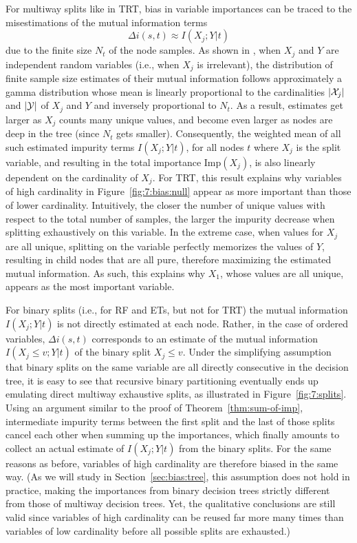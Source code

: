 For multiway splits like in TRT, bias in variable importances can be traced to the
misestimations of the mutual information terms
\begin{equation}
\Delta i(s, t) \approx I(X_j;Y|t)
\end{equation}
due to the finite size $N_t$ of the node samples. As shown in
\citep{goebel:2005}, when $X_j$ and $Y$ are independent random variables (i.e.,
when $X_j$ is irrelevant), the distribution of finite sample size estimates of
their mutual information  follows approximately a gamma distribution whose mean
is linearly proportional to the cardinalities $|{\cal X}_j|$ and $|{\cal Y}|$
of $X_j$ and $Y$ and inversely proportional to $N_t$.
As a result, estimates get larger as $X_j$ counts many unique values, and
become even larger as nodes are deep in the tree (since $N_t$ gets smaller).
Consequently, the weighted mean of all such estimated impurity terms
$I(X_j;Y|t)$, for all nodes $t$ where $X_j$ is the split variable, and
resulting in the total importance $\text{Imp}(X_j)$, is also linearly dependent
on the cardinality of $X_j$. For TRT, this result explains why variables of
high cardinality in Figure~\ref{fig:7:bias:null} appear as more important than
those of lower cardinality. Intuitively, the closer the number of unique values
with respect to the total number of samples, the larger the impurity decrease
when splitting exhaustively on this variable. In the extreme case, when values
for $X_j$ are all unique, splitting on the variable perfectly memorizes the
values of $Y$, resulting in child nodes that are all pure, therefore maximizing
the estimated mutual information. As such, this explains why $X_1$, whose
values are all unique, appears as the most important variable.

For binary splits (i.e., for RF and ETs, but not for TRT) the mutual
information $I(X_j;Y|t)$ is not directly estimated at each node. Rather, in the
case of ordered variables, $\Delta i(s, t)$ corresponds to an estimate of the
mutual information $I(X_j\leq v;Y|t)$ of the binary split $X_j \leq v$. Under
the simplifying assumption that binary splits on the same variable are all
directly consecutive in the decision tree,  it is easy to see that recursive
binary partitioning eventually ends up emulating direct multiway exhaustive
splits, as illustrated in Figure~\ref{fig:7:splits}. Using an argument similar
to the proof of Theorem~\ref{thm:sum-of-imp}, intermediate impurity terms
between the first split and the last of those splits cancel each other when
summing up the importances, which finally amounts to collect an actual estimate
of $I(X_j;Y|t)$ from the binary splits. For the same reasons as before,
variables of high cardinality are therefore biased in the same way. (As we will
study in Section~\ref{sec:bias:tree}, this assumption does not hold in
practice, making the importances from binary decision trees strictly different
from those of multiway decision trees. Yet, the qualitative conclusions are
still valid since variables of high cardinality can be reused far more many
times than variables of low cardinality before all possible splits are
exhausted.)

